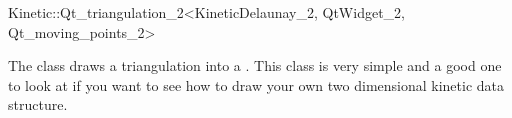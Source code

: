 

\begin{ccRefClass}{Kinetic::Qt_triangulation_2<KineticDelaunay_2, QtWidget_2, Qt_moving_points_2>}  %


\ccDefinition
  
The class draws a triangulation into a . This class is
very simple and a good one to look at if you want to see how to draw
your own two dimensional kinetic data structure.


\ccCreation
{}  %



\end{ccRefClass}



